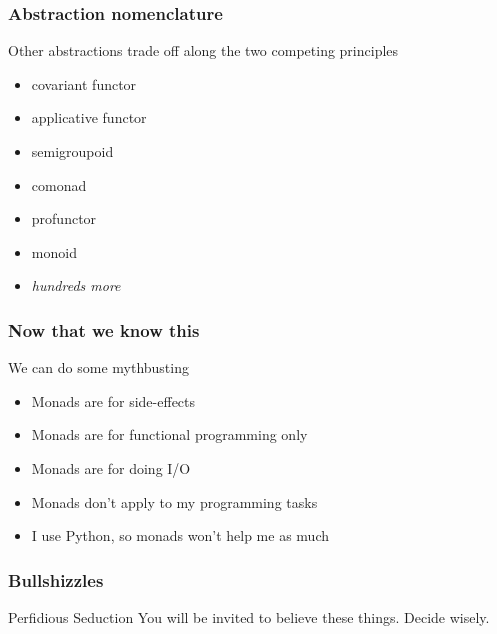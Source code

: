 \begin{frame}
\frametitle{Abstraction nomenclature}
\begin{block}{Other abstractions trade off along the two competing principles}
\begin{itemize}
  \item covariant functor
  \item applicative functor
  \item semigroupoid
  \item comonad
  \item profunctor
  \item monoid
  \item \emph{hundreds more}
\end{itemize}
\end{block}
\end{frame}


\begin{frame}
\frametitle{Now that we know this}
\begin{block}{We can do some mythbusting}
\begin{itemize}
  \item<1-> Monads are for side-effects
  \item<2-> Monads are for functional programming only
  \item<3-> Monads are for doing I/O
  \item<4-> Monads don't apply to my programming tasks
  \item<5-> I use Python, so monads won't help me as much
\end{itemize}
\end{block}
\end{frame}


\begin{frame}
\frametitle{Bullshizzles}
\begin{block}{Perfidious Seduction}
You will be invited to believe these things. Decide wisely.
\end{block}
\end{frame}


